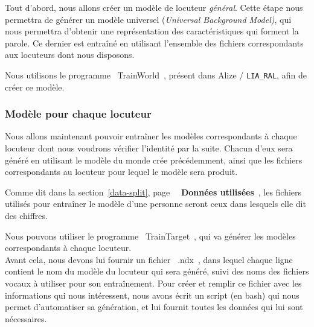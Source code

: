 \documentclass[a4paper, 12pt]{book}
\newcounter{program}[subsection]
\begin{document}
Tout d'abord, nous allons créer un modèle de locuteur \textit{général}. Cette étape nous permettra de générer un modèle universel (\textit{Universal Background Model)}, qui nous permettra d'obtenir une représentation des caractéristiques qui forment la parole. Ce dernier est entraîné en utilisant l'ensemble des fichiers correspondants aux locuteurs dont nous disposons. 

Nous utilisons le programme \guillemotleft{}~TrainWorld~\guillemotright{}, présent dans Alize / \texttt{LIA\_RAL}, afin de créer ce modèle.

\subsubsection{Modèle pour chaque locuteur}

Nous allons maintenant pouvoir entraîner les modèles correspondants à chaque locuteur dont nous voudrons vérifier l'identité par la suite.
Chacun d'eux sera généré en utilisant le modèle du monde crée précédemment, ainsi que les fichiers correspondants au locuteur pour lequel le modèle sera produit.

Comme dit dans la section~\ref{data-split}, page~\pageref{data-split} \guillemotleft{}~\textbf{Données utilisées}~\guillemotright{}, les fichiers utilisés pour entraîner le modèle d'une personne seront ceux dans lesquels elle dit des chiffres.

Nous pouvons utiliser le programme \guillemotleft{}~TrainTarget~\guillemotright{}, qui va générer les modèles correspondants à chaque locuteur.\\
Avant cela, nous devons lui fournir un fichier \guillemotleft{}~.ndx~\guillemotright{}, dans lequel chaque ligne contient le nom du modèle du locuteur qui sera généré, suivi des noms des fichiers vocaux à utiliser pour son entraînement. Pour créer et remplir ce fichier avec les informations qui nous intéressent, nous avons écrit un script (en bash) qui nous permet d'automatiser sa génération, et lui fournit toutes les données qui lui sont nécessaires.
\end{document}
